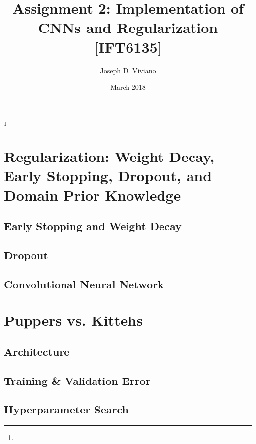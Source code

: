 \documentclass{amsart}
\theoremstyle{definition}
\theoremstyle{remark}
\numberwithin{equation}{section}
\begin{document}
\title{Assignment 2: Implementation of CNNs and Regularization [IFT6135]}

\author{Joseph D. Viviano}
\address{Universit\'e de Montr\'eal}
\curraddr{}
\thanks{}
\date{March 2018}

\maketitle

\section{Regularization: Weight Decay, Early Stopping, Dropout, and Domain Prior Knowledge}

\subsection{Early Stopping and Weight Decay}


\subsection{Dropout}

\subsection{Convolutional Neural Network}


\section{Puppers vs. Kittehs}




\subsection{Architecture}
\subsection{Training \& Validation Error}


\subsection{Hyperparameter Search}

\end{document}
